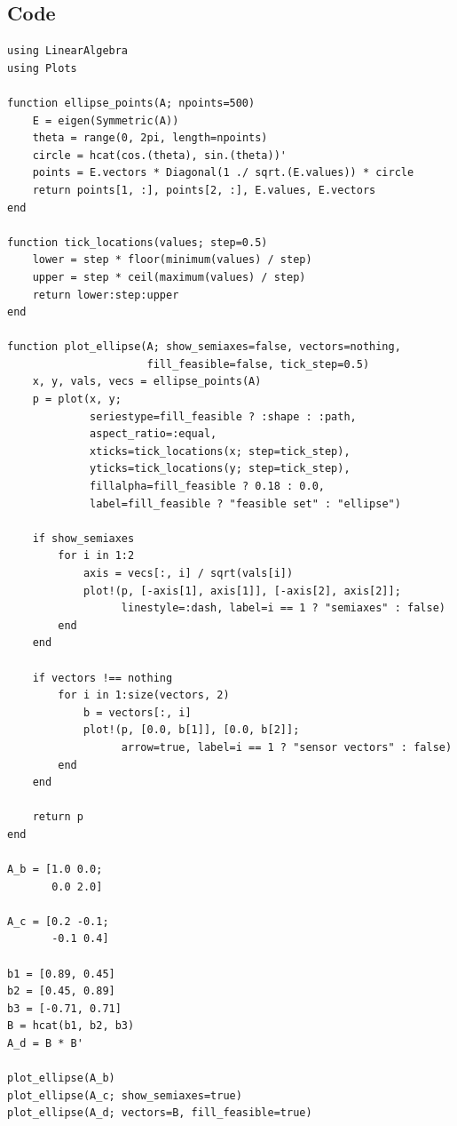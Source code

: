 \subsection{Code}
\begin{lstlisting}[language={}]
using LinearAlgebra
using Plots

function ellipse_points(A; npoints=500)
    E = eigen(Symmetric(A))
    theta = range(0, 2pi, length=npoints)
    circle = hcat(cos.(theta), sin.(theta))'
    points = E.vectors * Diagonal(1 ./ sqrt.(E.values)) * circle
    return points[1, :], points[2, :], E.values, E.vectors
end

function tick_locations(values; step=0.5)
    lower = step * floor(minimum(values) / step)
    upper = step * ceil(maximum(values) / step)
    return lower:step:upper
end

function plot_ellipse(A; show_semiaxes=false, vectors=nothing,
                      fill_feasible=false, tick_step=0.5)
    x, y, vals, vecs = ellipse_points(A)
    p = plot(x, y;
             seriestype=fill_feasible ? :shape : :path,
             aspect_ratio=:equal,
             xticks=tick_locations(x; step=tick_step),
             yticks=tick_locations(y; step=tick_step),
             fillalpha=fill_feasible ? 0.18 : 0.0,
             label=fill_feasible ? "feasible set" : "ellipse")

    if show_semiaxes
        for i in 1:2
            axis = vecs[:, i] / sqrt(vals[i])
            plot!(p, [-axis[1], axis[1]], [-axis[2], axis[2]];
                  linestyle=:dash, label=i == 1 ? "semiaxes" : false)
        end
    end

    if vectors !== nothing
        for i in 1:size(vectors, 2)
            b = vectors[:, i]
            plot!(p, [0.0, b[1]], [0.0, b[2]];
                  arrow=true, label=i == 1 ? "sensor vectors" : false)
        end
    end

    return p
end

A_b = [1.0 0.0;
       0.0 2.0]

A_c = [0.2 -0.1;
       -0.1 0.4]

b1 = [0.89, 0.45]
b2 = [0.45, 0.89]
b3 = [-0.71, 0.71]
B = hcat(b1, b2, b3)
A_d = B * B'

plot_ellipse(A_b)
plot_ellipse(A_c; show_semiaxes=true)
plot_ellipse(A_d; vectors=B, fill_feasible=true)
\end{lstlisting}
